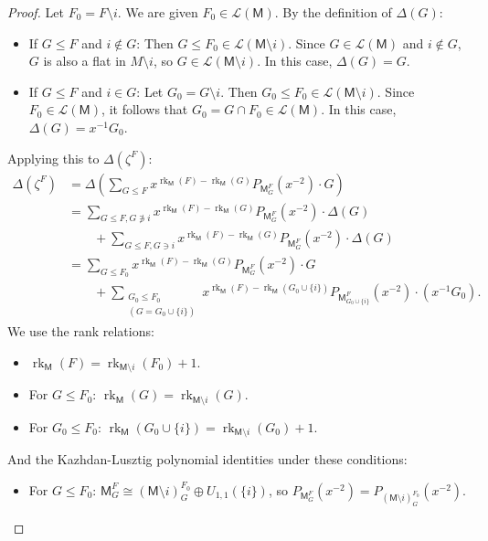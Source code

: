 \documentclass[11pt, a4paper, english]{amsart}
\theoremstyle{teoremas}
\theoremstyle{definition}
\DeclareMathOperator{\rk}{rk}
\newcommand{\M}{\mathsf{M}}
\newcommand{\cL}{\mathcal{L}}
\begin{document}
\begin{proof}
    Let $F_0 = F\setminus i$. We are given $F_0 \in \cL(\M)$.
    By the definition of $\Delta(G)$:
    \begin{itemize}
        \item If $G \leq F$ and $i \notin G$: Then $G \leq F_0 \in \cL(\M\setminus i)$. Since $G \in \cL(\M)$ and $i \notin G$, $G$ is also a flat in $M\setminus i$, so $G \in \cL(\M\setminus i)$. In this case, $\Delta(G) = G$.
        \item If $G \leq F$ and $i \in G$: Let $G_0 = G\setminus i$. Then $G_0 \leq F_0 \in \cL(\M\setminus i)$. Since $F_0 \in \cL(\M)$, it follows that $G_0 = G \cap F_0 \in \cL(\M)$. In this case, $\Delta(G) = x^{-1}G_0$.
    \end{itemize}
    Applying this to $\Delta(\zeta^F)$:
    \begin{align*}
        \Delta(\zeta^F) & = \Delta \left( \sum_{G \leq F} x^{\rk_{\M}(F) - \rk_{\M}(G)} P_{\M_G^F}(x^{-2}) \cdot G \right)   \\
                        & = \sum_{G \leq F, G \not\ni i} x^{\rk_{\M}(F) - \rk_{\M}(G)} P_{\M_G^F}(x^{-2}) \cdot \Delta(G)    \\
                        & \qquad + \sum_{G \leq F, G \ni i} x^{\rk_{\M}(F) - \rk_{\M}(G)} P_{\M_G^F}(x^{-2}) \cdot \Delta(G) \\
                        & = \sum_{G \leq F_0} x^{\rk_{\M}(F) - \rk_{\M}(G)} P_{\M_G^F}(x^{-2}) \cdot G                       \\
                        & \qquad + \sum_{\substack{G_0 \leq F_0                                                              \\ (G = G_0 \cup \{i\})}} x^{\rk_{\M}(F) - \rk_{\M}(G_0 \cup \{i\})} P_{\M_{G_0 \cup \{i\}}^{F}}(x^{-2}) \cdot (x^{-1}G_0).
    \end{align*}
    We use the rank relations:
    \begin{itemize}
        \item $\rk_{\M}(F) = \rk_{\M\setminus i}(F_0) + 1$.
        \item For $G \leq F_0$: $\rk_{\M}(G) = \rk_{\M\setminus i}(G)$.
        \item For $G_0 \leq F_0$: $\rk_{\M}(G_0 \cup \{i\}) = \rk_{\M\setminus i}(G_0) + 1$.
    \end{itemize}
    And the Kazhdan-Lusztig polynomial identities under these conditions:
    \begin{itemize}
        \item For $G \leq F_0$: $\M_G^F \cong (\M\setminus i)_G^{F_0} \oplus U_{1,1}(\{i\})$, so $P_{\M_G^F}(x^{-2}) = P_{(\M\setminus i)_G^{F_0}}(x^{-2})$.

\end{itemize}
\end{proof}
\end{document}
